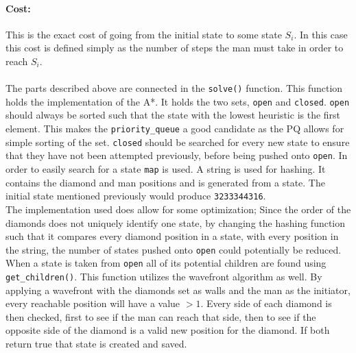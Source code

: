 \paragraph{Cost:}
This is the exact cost of going from the initial state to some state $S_i$. 
In this case this cost is defined simply as the number of steps the man must take in order to reach $S_i$.\\~\\

The parts described above are connected in the \texttt{solve()} function. 
This function holds the implementation of the A*.
It holds the two sets, \texttt{open} and \texttt{closed}.
\texttt{open} should always be sorted such that the state with the lowest heuristic is the first element.
This makes the \texttt{priority\_queue} a good candidate as the PQ allows for simple sorting of the set.
\texttt{closed} should be searched for every new state to ensure that they have not been attempted previously, before being pushed onto \texttt{open}.
In order to easily search for a state \texttt{map} is used. 
A string is used for hashing. It contains the diamond and man positions and is generated from a state. 
The initial state mentioned previously would produce \texttt{3233344316}.\\
The implementation used does allow for some optimization;
Since the order of the diamonds does not uniquely identify one state, by changing the hashing function such that it compares every diamond position in a state, with every position in the string, the number of states pushed onto \texttt{open} could potentially be reduced.\\
When a state is taken from \texttt{open} all of its potential children are found using \texttt{get\_children()}. 
This function utilizes the wavefront algorithm as well.
By applying a wavefront with the diamonds set as walls and the man as the initiator, every reachable position will have a value $>1$.
Every side of each diamond is then checked, first to see if the man can reach that side, then to see if the opposite side of the diamond is a valid new position for the diamond.
If both return true that state is created and saved.


